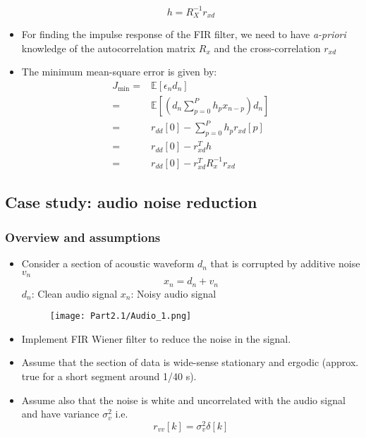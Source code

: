 \documentclass[12pt]{article}
\newcommand{\sigd}{\sigma^2}
\newcommand{\mexp}{\mathbb{E}}
\newcommand{\summ}[2]{\sum_{#1}^{#2}}
\newcommand{\sumpzerop}{\summ{p=0}{P}}
\newcommand{\err}{\epsilon_n}
\begin{document}
\begin{itemize}
    \[
    h = R_X^{-1} r_{xd}
    \]
    \item For finding the impulse response of the FIR filter, we need to have \textit{a-priori} knowledge of the autocorrelation matrix $R_x$ and the cross-correlation $r_{xd}$
    \item The minimum mean-square error is given by:
    \begin{align*}
        J_{\min} =& \mexp[\err d_n] \\
        =& \mexp[(d_n \sumpzerop h_p x_{n-p})d_n] \\
        =& r_{dd}[0] - \sumpzerop h_p r_{xd}[p] \\
        = &r_{dd}[0] - r^T_{xd} h \\
        =& r_{dd}[0] - r^T_{xd} R_x^{-1}r_{xd}
    \end{align*}
    
\end{itemize}
\subsection{Case study: audio noise reduction}
\subsubsection{Overview and assumptions}
\begin{itemize}
    \item Consider a section of acoustic waveform $d_n$ that is corrupted by additive noise $v_n$
    \[
    x_n = d_n + v_n
    \]
    $d_n$: Clean audio signal \qquad $x_n$: Noisy audio signal  
    \begin{figure}[H]
        \centering
        \texttt{[image: Part2.1/Audio\_1.png]}
    \end{figure}
    \item Implement FIR Wiener filter to reduce the noise in the signal.
    \item Assume that the section of data is wide-sense stationary and ergodic (approx. true for a short segment around 1/40 s).
    \item Assume also that the noise is white and uncorrelated with the audio signal and have variance $\sigd_v$ i.e.
    \[
    r_{vv}[k] =\sigd_v \delta[k]
    \]
\end{itemize}
\end{document}
